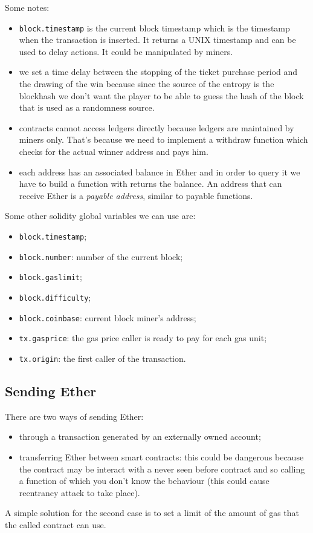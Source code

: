 Some notes:
\begin{itemize}
    \item \verb|block.timestamp| is the current block timestamp which is the timestamp when the transaction is inserted.
    It returns a UNIX timestamp and can be used to delay actions.
    It could be manipulated by miners.

    \item we set a time delay between the stopping of the ticket purchase period and the drawing of the win because since the source of the entropy is the blockhash we don't want the player to be able to guess the hash of the block that is used as a randomness source.

    \item contracts cannot access ledgers directly because ledgers are maintained by miners only.
    That's because we need to implement a withdraw function which checks for the actual winner address and pays him.

    \item each address has an associated balance in Ether and in order to query it we have to build a function with returns the balance.
    An address that can receive Ether is a \emph{payable address}, similar to payable functions.
    
\end{itemize}

Some other solidity global variables we can use are:
\begin{itemize}
    \item \verb|block.timestamp|;
    \item \verb|block.number|: number of the current block;
    \item \verb|block.gaslimit|;
    \item \verb|block.difficulty|;
    \item \verb|block.coinbase|: current block miner's address;
    \item \verb|tx.gasprice|: the gas price caller is ready to pay for each gas unit;
    \item \verb|tx.origin|: the first caller of the transaction.
\end{itemize}


\subsection{Sending Ether}
There are two ways of sending Ether:
\begin{itemize}
    \item through a transaction generated by an externally owned account;
    \item transferring Ether between smart contracts: this could be dangerous because the contract may be interact with a never seen before contract and so calling a function of which you don't know the behaviour (this could cause reentrancy attack to take place).
\end{itemize}
A simple solution for the second case is to set a limit of the amount of gas that the called contract can use.

